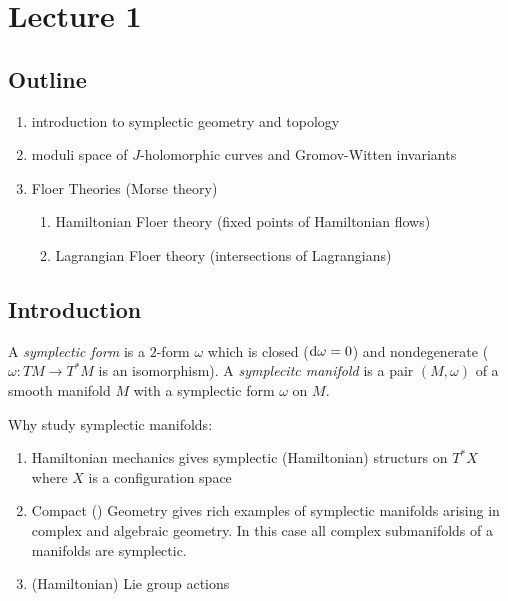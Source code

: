 \documentclass[12pt]{article}
\begin{document}
\tableofcontents

\section{Lecture 1}

\subsection{Outline}

\begin{enumerate}
\item introduction to symplectic geometry and topology
\item moduli space of $J$-holomorphic curves and Gromov-Witten invariants
\item Floer Theories (Morse theory)
\begin{enumerate}
\item Hamiltonian Floer theory (fixed points of Hamiltonian flows)
\item Lagrangian Floer theory (intersections of Lagrangians)
\end{enumerate}
\end{enumerate}

\subsection{Introduction}


\begin{defn}
A \textit{symplectic form} is a $2$-form $\omega$ which is closed ($\mathrm{d}{\omega} = 0$) and nondegenerate ($\omega : T M \to T^*M$ is an isomorphism). A \textit{symplecitc manifold} is a pair $(M, \omega)$ of a smooth manifold $M$ with a symplectic form $\omega$ on $M$.
\end{defn}

Why study symplectic manifolds:

\begin{enumerate}
\item Hamiltonian mechanics gives symplectic (Hamiltonian) structurs on $T^* X$ where $X$ is a configuration space
\item Compact (\kahler) Geometry gives rich examples of symplectic manifolds arising in complex and algebraic geometry. In this case all complex submanifolds of a \kahler manifolds are symplectic. 
\item (Hamiltonian) Lie group actions 
\end{enumerate}
\end{document}
